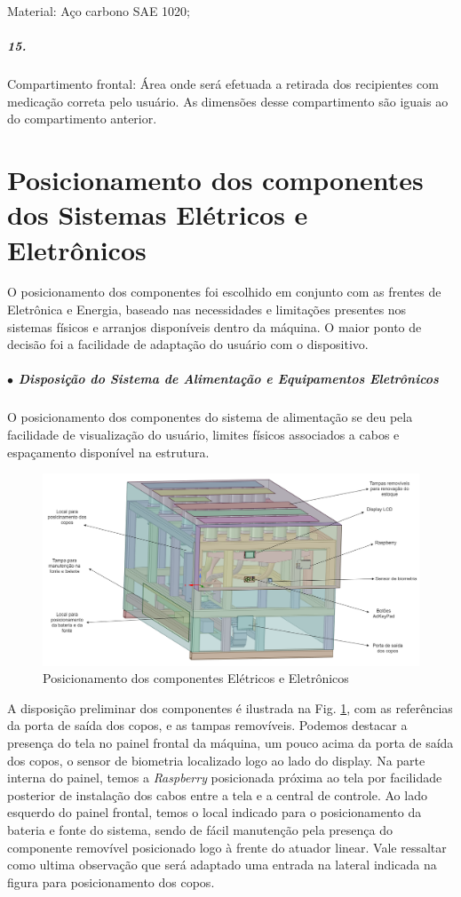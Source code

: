  Material: Aço carbono SAE 1020;

\subparagraph*{15.}
Compartimento frontal: Área onde será efetuada a retirada dos recipientes com medicação correta pelo usuário. As dimensões desse compartimento são iguais ao do compartimento anterior.

\section{Posicionamento dos componentes dos Sistemas Elétricos e Eletrônicos}

O posicionamento dos componentes foi escolhido em conjunto com as frentes de Eletrônica e Energia, baseado nas necessidades e limitações presentes nos sistemas físicos e arranjos disponíveis dentro da máquina. O maior ponto de decisão foi a facilidade de adaptação do usuário com o dispositivo.

\subparagraph*{$\bullet$ Disposição do Sistema de Alimentação e Equipamentos Eletrônicos} \hfill

O posicionamento dos componentes do sistema de alimentação se deu pela facilidade de visualização do usuário, limites físicos associados a cabos e espaçamento disponível na estrutura.  

\begin{figure}[H]
        \centering
        \includegraphics[width=1.1\textwidth]{figuras/estrutura/Design/externos.png}
        \caption{Posicionamento dos componentes Elétricos e Eletrônicos}
        \label{fig:Vista_componentes}
    \end{figure}

A disposição preliminar dos componentes é ilustrada na Fig. \ref{fig:Vista_componentes}, com as referências da porta de saída dos copos, e as tampas removíveis. Podemos destacar a presença do tela no painel frontal da máquina, um pouco acima da porta de saída dos copos, o sensor de biometria localizado logo ao lado do display. 
Na parte interna do painel, temos a \textit{Raspberry} posicionada próxima ao tela por facilidade posterior de instalação dos cabos entre a tela e a central de controle. Ao lado esquerdo do painel frontal, temos o local indicado para o posicionamento da bateria e fonte do sistema, sendo de fácil manutenção pela presença do componente removível posicionado logo à frente do atuador linear. Vale ressaltar como ultima observação que será adaptado uma entrada na lateral indicada na figura para posicionamento dos copos.

